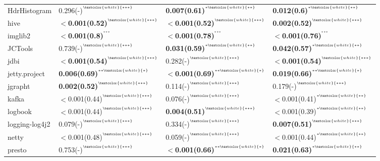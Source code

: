 \begin{tabular}{llll}
HdrHistogram        &  0.296(-)\tiny{$^{^{\textcolor{white}{***}}}$} &  \textbf{0.007(0.61)}\tiny{$^{^{*\textcolor{white}{**}}}$} &  \textbf{0.012(0.6)}\tiny{$^{^{*\textcolor{white}{**}}}$} \\
hive                &  \textbf{$<$0.001(0.52)}\tiny{$^{^{\textcolor{white}{***}}}$} &  \textbf{$<$0.001(0.52)}\tiny{$^{^{\textcolor{white}{***}}}$} &  \textbf{0.002(0.52)}\tiny{$^{^{\textcolor{white}{***}}}$} \\
imglib2             &  \textbf{$<$0.001(0.8)}\tiny{$^{^{***}}$} &  \textbf{$<$0.001(0.78)}\tiny{$^{^{***}}$} &  \textbf{$<$0.001(0.76)}\tiny{$^{^{***}}$} \\
JCTools             &  0.739(-)\tiny{$^{^{\textcolor{white}{***}}}$} &  \textbf{0.031(0.59)}\tiny{$^{^{*\textcolor{white}{**}}}$} &  \textbf{0.042(0.57)}\tiny{$^{^{*\textcolor{white}{**}}}$} \\
jdbi                &  \textbf{$<$0.001(0.54)}\tiny{$^{^{\textcolor{white}{***}}}$} &  0.282(-)\tiny{$^{^{\textcolor{white}{***}}}$} &  \textbf{$<$0.001(0.54)}\tiny{$^{^{\textcolor{white}{***}}}$} \\
jetty.project       &  \textbf{0.006(0.69)}\tiny{$^{^{**\textcolor{white}{*}}}$} &  \textbf{$<$0.001(0.69)}\tiny{$^{^{**\textcolor{white}{*}}}$} &  \textbf{0.019(0.66)}\tiny{$^{^{**\textcolor{white}{*}}}$} \\
jgrapht             &  \textbf{0.002(0.52)}\tiny{$^{^{\textcolor{white}{***}}}$} &  0.114(-)\tiny{$^{^{\textcolor{white}{***}}}$} &  0.179(-)\tiny{$^{^{\textcolor{white}{***}}}$} \\
kafka               &  $<$0.001(0.44)\tiny{$^{^{\textcolor{white}{***}}}$} &  0.076(-)\tiny{$^{^{\textcolor{white}{***}}}$} &  $<$0.001(0.41)\tiny{$^{^{*\textcolor{white}{**}}}$} \\
logbook             &  $<$0.001(0.44)\tiny{$^{^{\textcolor{white}{***}}}$} &  \textbf{0.004(0.51)}\tiny{$^{^{\textcolor{white}{***}}}$} &  $<$0.001(0.39)\tiny{$^{^{*\textcolor{white}{**}}}$} \\
logging-log4j2      &  0.079(-)\tiny{$^{^{\textcolor{white}{***}}}$} &  0.334(-)\tiny{$^{^{\textcolor{white}{***}}}$} &  \textbf{0.007(0.51)}\tiny{$^{^{\textcolor{white}{***}}}$} \\
netty               &  $<$0.001(0.48)\tiny{$^{^{\textcolor{white}{***}}}$} &  0.059(-)\tiny{$^{^{\textcolor{white}{***}}}$} &  $<$0.001(0.44)\tiny{$^{^{*\textcolor{white}{**}}}$} \\
presto              &  0.753(-)\tiny{$^{^{\textcolor{white}{***}}}$} &  \textbf{$<$0.001(0.66)}\tiny{$^{^{**\textcolor{white}{*}}}$} &  \textbf{0.021(0.63)}\tiny{$^{^{*\textcolor{white}{**}}}$} \\

\end{tabular}
